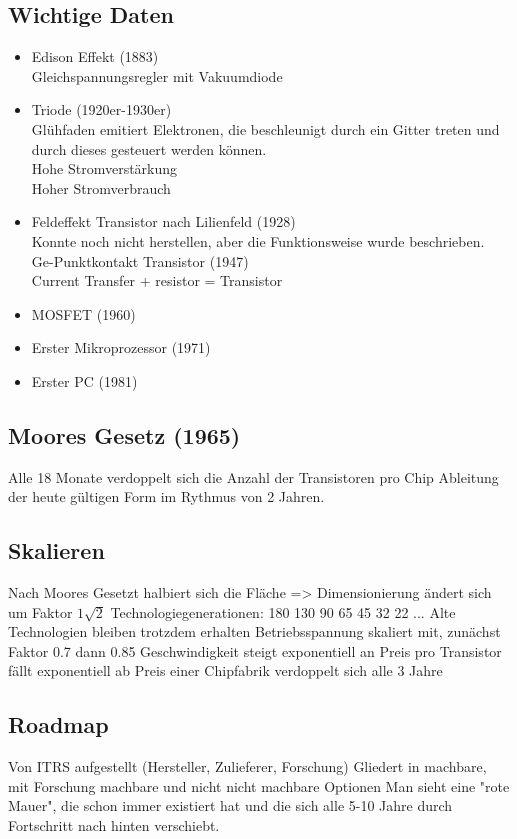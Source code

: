 


\subsection{Wichtige Daten}
\begin{itemize}
	\item Edison Effekt (1883)\\
	Gleichspannungsregler mit Vakuumdiode
	\item Triode (1920er-1930er)\\
	Glühfaden emitiert Elektronen, die beschleunigt durch ein Gitter treten und durch dieses gesteuert werden können.\\
	Hohe Stromverstärkung\\
	Hoher Stromverbrauch
	\item Feldeffekt Transistor nach Lilienfeld (1928)\\
	Konnte noch nicht herstellen, aber die Funktionsweise wurde beschrieben.\\
	Ge-Punktkontakt Transistor (1947)\\
	Current Transfer + resistor = Transistor
	\item MOSFET (1960)
	\item Erster Mikroprozessor (1971)
	\item Erster PC (1981)
\end{itemize}

\subsection{Moores Gesetz (1965)}
Alle 18 Monate verdoppelt sich die Anzahl der Transistoren pro Chip
Ableitung der heute gültigen Form im Rythmus von 2 Jahren.

\subsection{Skalieren}
Nach Moores Gesetzt halbiert sich die Fläche
=> Dimensionierung ändert sich um Faktor $1 \sqrt{2}$
Technologiegenerationen: 180 130 90 65 45 32 22 ...
Alte Technologien bleiben trotzdem erhalten
Betriebsspannung skaliert mit, zunächst Faktor 0.7 dann 0.85
Geschwindigkeit steigt exponentiell an
Preis pro Transistor fällt exponentiell ab
Preis einer Chipfabrik verdoppelt sich alle 3 Jahre

\subsection{Roadmap}
Von ITRS aufgestellt (Hersteller, Zulieferer, Forschung)
Gliedert in machbare, mit Forschung machbare und nicht nicht machbare Optionen
Man sieht eine "rote Mauer", die schon immer existiert hat und die sich alle 5-10 Jahre durch Fortschritt nach hinten verschiebt.

